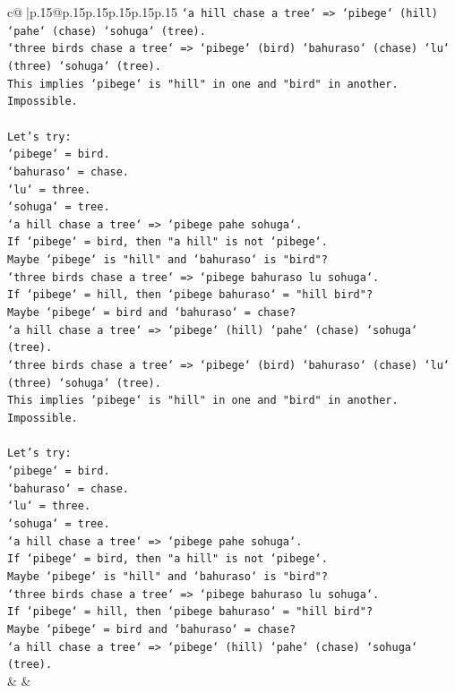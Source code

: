 \documentclass{article}
\begin{document}
{\begin{supertabular}{c@{$\;$}|p{.15\linewidth}@{}p{.15\linewidth}p{.15\linewidth}p{.15\linewidth}p{.15\linewidth}p{.15\linewidth}}
{{{\texttt{`a hill chase a tree` => `pibege` (hill) `pahe` (chase) `sohuga` (tree).} \\
\texttt{`three birds chase a tree` => `pibege` (bird) `bahuraso` (chase) `lu` (three) `sohuga` (tree).} \\
\texttt{This implies `pibege` is "hill" in one and "bird" in another. Impossible.} \\
\\ 
\texttt{Let's try:} \\
\texttt{`pibege` = bird.} \\
\texttt{`bahuraso` = chase.} \\
\texttt{`lu` = three.} \\
\texttt{`sohuga` = tree.} \\
\texttt{`a hill chase a tree` => `pibege pahe sohuga`.} \\
\texttt{If `pibege` = bird, then "a hill" is not `pibege`.} \\
\texttt{Maybe `pibege` is "hill" and `bahuraso` is "bird"?} \\
\texttt{`three birds chase a tree` => `pibege bahuraso lu sohuga`.} \\
\texttt{If `pibege` = hill, then `pibege bahuraso` = "hill bird"?} \\
\texttt{Maybe `pibege` = bird and `bahuraso` = chase?} \\
\texttt{`a hill chase a tree` => `pibege` (hill) `pahe` (chase) `sohuga` (tree).} \\
\texttt{`three birds chase a tree` => `pibege` (bird) `bahuraso` (chase) `lu` (three) `sohuga` (tree).} \\
\texttt{This implies `pibege` is "hill" in one and "bird" in another. Impossible.} \\
\\ 
\texttt{Let's try:} \\
\texttt{`pibege` = bird.} \\
\texttt{`bahuraso` = chase.} \\
\texttt{`lu` = three.} \\
\texttt{`sohuga` = tree.} \\
\texttt{`a hill chase a tree` => `pibege pahe sohuga`.} \\
\texttt{If `pibege` = bird, then "a hill" is not `pibege`.} \\
\texttt{Maybe `pibege` is "hill" and `bahuraso` is "bird"?} \\
\texttt{`three birds chase a tree` => `pibege bahuraso lu sohuga`.} \\
\texttt{If `pibege` = hill, then `pibege bahuraso` = "hill bird"?} \\
\texttt{Maybe `pibege` = bird and `bahuraso` = chase?} \\
\texttt{`a hill chase a tree` => `pibege` (hill) `pahe` (chase) `sohuga` (tree).} \\
            }
        }
    }
    & & \\ \\


\end{supertabular}}
\end{document}
